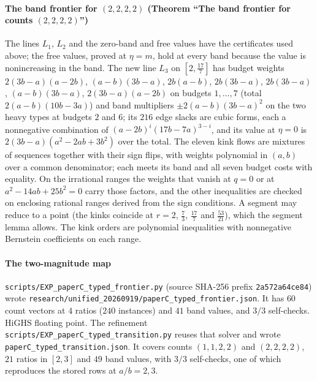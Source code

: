 \paragraph{The band frontier for $(2,2,2,2)$ (Theorem ``The band frontier for counts $(2,2,2,2)$'')}
The lines $L_1$, $L_2$ and the zero-band and free values have the certificates used above; the free
values, proved at $\eta=m$, hold at every band because the value is nonincreasing in the band. The
new line $L_3$ on $[2,\frac{17}7]$ has budget weights $2(3b-a)(a-2b)$, $(a-b)(3b-a)$, $2b(a-b)$,
$2b(3b-a)$, $2b(3b-a)$, $(a-b)(3b-a)$, $2(3b-a)(a-2b)$ on budgets $1,\dots,7$ (total $2(a-b)(10b-3a)$)
and band multipliers $\pm2(a-b)(3b-a)^2$ on the two heavy types at budgets $2$ and $6$; its $216$ edge
slacks are cubic forms, each a nonnegative combination of $(a-2b)^i(17b-7a)^{3-i}$, and its value
at $\eta=0$ is $2(3b-a)(a^2-2ab+3b^2)$ over the total. The eleven kink flows are mixtures of
sequences together with their sign flips, with weights polynomial in $(a,b)$ over a common
denominator; each meets its band and all seven budget costs with equality. On the irrational
ranges the weights that vanish at $q=0$ or at $a^2-14ab+25b^2=0$ carry those factors, and the
other inequalities are checked on enclosing rational ranges derived from the sign conditions. A
segment may reduce to a point (the kinks coincide at $r=2$, $\frac73$, $\frac{17}7$ and
$\frac{53}{21}$), which the segment lemma allows. The kink orders are polynomial inequalities with
nonnegative Bernstein coefficients on each range.

\paragraph{The two-magnitude map} \texttt{scripts/EXP\_paperC\_typed\_frontier.py} (source
SHA-256 prefix \texttt{2a572a64ce84}) wrote
\texttt{research/unified\_20260919/paperC\_typed\_frontier.json}. It has $60$ count vectors
at $4$ ratios ($240$ instances) and $41$ band values, and $3/3$ self-checks. HiGHS floating point. The refinement
\texttt{scripts/EXP\_paperC\_typed\_transition.py} reuses that solver and wrote
\texttt{paperC\_typed\_transition.json}. It covers counts $(1,1,2,2)$ and $(2,2,2,2)$, $21$
ratios in $[2,3]$ and $49$ band values, with $3/3$ self-checks, one of which reproduces the
stored rows at $a/b=2,3$. \NUM{}

